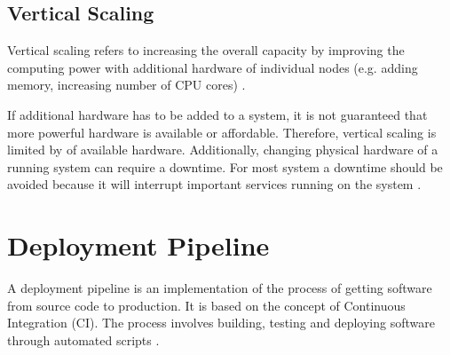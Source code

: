 \subsection{Vertical Scaling}
\label{subsec:02_foundations_scalability_vertical-scaling}
Vertical scaling refers to increasing the overall capacity by improving the computing power with additional hardware of individual nodes (e.g. adding memory, increasing number of CPU cores) \cite{Wilder2012CloudPatterns}.


If additional hardware has to be added to a system, it is not guaranteed that more powerful hardware is available or affordable.
Therefore, vertical scaling is limited by of available hardware.
Additionally, changing physical hardware of a running system can require a downtime. For most system a downtime should be avoided because it will interrupt important services running on the system \cite{Wilder2012CloudPatterns}.


\section{Deployment Pipeline}
A deployment pipeline is an implementation of the process of getting software from source code to production.
It is based on the concept of Continuous Integration (CI).
The process involves building, testing and deploying software through automated scripts \cite{Farley2010CI}.


